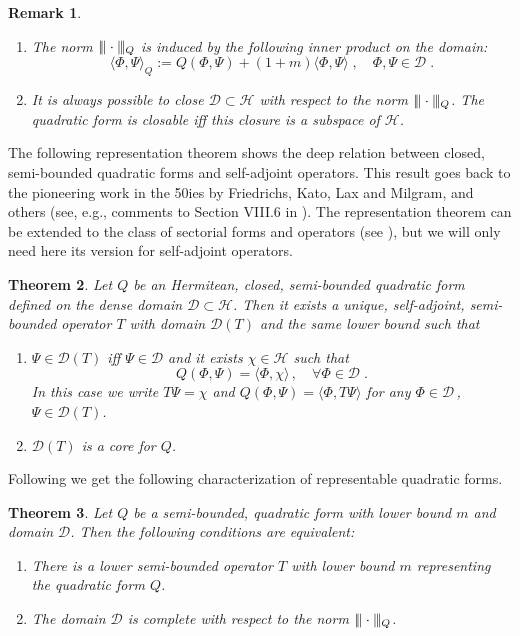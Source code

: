 \documentclass[a4paper,12pt]{amsart}
\newcommand{\normm}[1]{|\negthinspace\|#1\|\negthinspace|}
\renewcommand{\H}{\mathcal{H}}
\newcommand{\D}{\mathcal{D}}
\newcommand{\1}{\mathbb{I}}
\newtheorem{theorem}{Theorem}
\newtheorem{remark}[theorem]{Remark}
\numberwithin{equation}{section}
\numberwithin{theorem}{section}
\begin{document}
\begin{remark}$\phantom{=}$\label{Remclosable}
\begin{enumerate}
\item The norm $\normm{\cdot}_Q$ is induced by the following inner product on
the domain:
\[
 \langle\Phi,\Psi\rangle_Q:= Q(\Phi,\Psi)+(1+m)\langle\Phi,\Psi\rangle\;,\quad \Phi,\Psi\in\D\;.
\]
 \item It is always possible to close $\D \subset\mathcal{H}$ with respect to the norm $\normm{\cdot}_Q$.
The quadratic form is closable iff this closure is a subspace of $\H$.
 \end{enumerate}
\end{remark}

The following representation theorem shows the
deep relation between closed, semi-bounded quadratic forms and self-adjoint operators.
This result goes back to the pioneering work in the 50ies by Friedrichs, Kato, Lax and Milgram, and others 
(see, e.g., comments to Section VIII.6 in \cite{reed80}).
The representation theorem can be extended to the class of sectorial forms and operators
(see \cite[Section~VI.2]{kato95}), but we will only need here its version for
self-adjoint operators.

\begin{theorem}\label{fundteo}
Let $Q$ be an Hermitean, closed, semi-bounded quadratic form defined on the dense domain
$\D\subset\H$. Then it exists a unique, self-adjoint, semi-bounded operator $T$
with domain $\D(T)$ and the same lower bound such that
\begin{enumerate}
\item $\Psi\in\mathcal{D}(T)$ iff $\Psi\in \D$ and it exists $\chi \in \H$ such that
$$Q(\Phi,\Psi)=\langle\Phi,\chi\rangle\,,\quad\forall \Phi\in\D\;.$$
In this case we write $T\Psi=\chi$ and $Q(\Phi,\Psi)=\langle\Phi,T\Psi\rangle$ for any $\Phi\in\D$\,,\;$\Psi\in\D(T)$.
\item $\D(T)$ is a core for $Q$.
\end{enumerate}
\end{theorem}

Following \cite[Theorem~4.4.2]{davies95} we get the following characterization of
representable quadratic forms.
\begin{theorem}\label{pro:rep}
Let $Q$ be a semi-bounded, quadratic form with lower bound $m$ and domain $\D$. Then
the following conditions are equivalent:
\begin{enumerate}
 \item There is a lower semi-bounded operator $T$ with lower bound $m$ representing the quadratic form $Q$.
 \item The domain $\D$ is complete with respect to the norm $\normm{\cdot}_Q$.
\end{enumerate}
\end{theorem}
\end{document}
